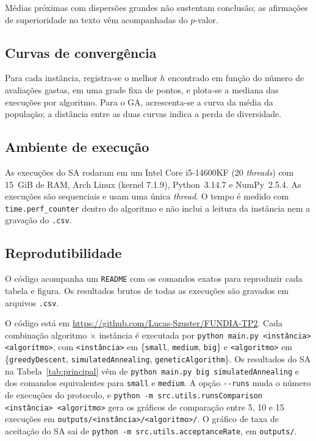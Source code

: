 Médias próximas com dispersões grandes não sustentam conclusão; as afirmações de superioridade no texto vêm acompanhadas do $p$-valor.

\subsection{Curvas de convergência}

Para cada instância, registra-se o melhor $h$ encontrado em função do número de avaliações gastas, em uma grade fixa de pontos, e plota-se a mediana das execuções por algoritmo. Para o GA, acrescenta-se a curva da média da população; a distância entre as duas curvas indica a perda de diversidade.

\subsection{Ambiente de execução}

As execuções do SA rodaram em um Intel Core i5-14600KF (20 \textit{threads}) com 15~GiB de RAM, Arch Linux (kernel 7.1.9), Python~3.14.7 e NumPy~2.5.4. As execuções são sequenciais e usam uma única \textit{thread}. O tempo é medido com \texttt{time.perf\_counter} dentro do algoritmo e não inclui a leitura da instância nem a gravação do \texttt{.csv}.


\subsection{Reprodutibilidade}

O código acompanha um \texttt{README} com os comandos exatos para reproduzir cada tabela e figura. Os resultados brutos de todas as execuções são gravados em arquivos \texttt{.csv}.

O código está em \url{https://github.com/Lucas-Szuster/FUNDIA-TP2}. Cada combinação algoritmo $\times$ instância é executada por \texttt{python main.py <instância> <algoritmo>}, com \texttt{<instância>} em \{\texttt{small}, \texttt{medium}, \texttt{big}\} e \texttt{<algoritmo>} em \{\texttt{greedyDescent}, \texttt{simulatedAnnealing}, \texttt{geneticAlgorithm}\}. Os resultados do SA na Tabela~\ref{tab:principal} vêm de \texttt{python main.py big simulatedAnnealing} e dos comandos equivalentes para \texttt{small} e \texttt{medium}. A opção \texttt{-{}-runs} muda o número de execuções do protocolo, e \texttt{python -m src.utils.runsComparison <instância> <algoritmo>} gera os gráficos de comparação entre 5, 10 e 15 execuções em \texttt{outputs/<instância>/<algoritmo>/}. O gráfico de taxa de aceitação do SA sai de \texttt{python -m src.utils.acceptanceRate}, em \texttt{outputs/}.

